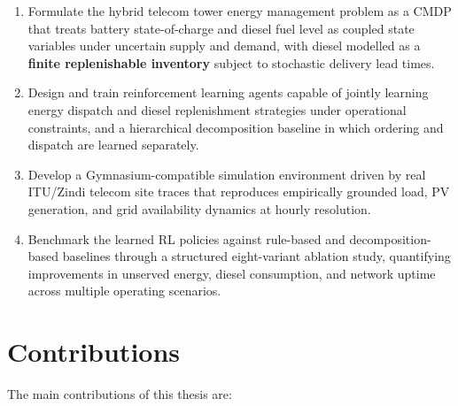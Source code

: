 \begin{enumerate}
  \item Formulate the hybrid telecom tower energy management problem as a CMDP
  that treats battery state-of-charge and diesel fuel level as coupled
  state variables under uncertain supply and demand, with diesel
  modelled as a \textbf{finite replenishable inventory} subject to stochastic
  delivery lead times.

  \item Design and train reinforcement learning agents capable of jointly
  learning energy dispatch and diesel replenishment strategies under
  operational constraints, and a hierarchical decomposition baseline in which
  ordering and dispatch are learned separately.

  \item Develop a Gymnasium-compatible simulation environment driven by real
  ITU/Zindi telecom site traces that reproduces empirically grounded load,
  PV generation, and grid availability dynamics at hourly resolution.

  \item Benchmark the learned RL policies against rule-based and
  decomposition-based baselines through a structured eight-variant ablation
  study, quantifying improvements in unserved energy, diesel consumption, and
  network uptime across multiple operating scenarios.
\end{enumerate}


\section{Contributions}

The main contributions of this thesis are:

